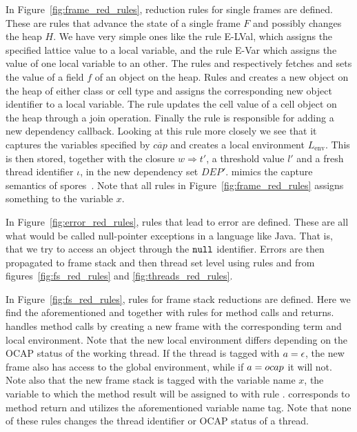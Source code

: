 In Figure~\ref{fig:frame_red_rules}, reduction rules for single frames are
defined. These are rules that advance the state of a single frame $F$ and
possibly changes the heap $H$. We have very simple ones like the rule {\sc
E-LVal}, which assigns the specified lattice value to a local variable, and the
rule {\sc E-Var} which assigns the value of one local variable to an other.
The rules \ESelect{} and \EAssign{} respectively fetches and sets the value of a
field $f$ of an object on the heap. Rules \ENew{} and \ENewCell{} creates a new
object on the heap of either class or cell type and assigns the corresponding
new object identifier to a local variable. The rule \EPut{} updates the cell
value of a cell object on the heap through a join operation.  Finally the rule
\EWhen{} is responsible for adding a new dependency callback. Looking at
this rule more closely we see that it captures the variables specified by
$\overline{cap}$ and creates a local environment $L_{\text{env}}$. This is then
stored, together with the closure $w \Rightarrow t'$, a threshold value $l'$ and
a fresh thread identifier $\iota$, in the new dependency set $DEP'$. \EWhen{} 
mimics the capture semantics of spores~\parencite{conf/ecoop/MillerHO14}.
Note that all rules in Figure~\ref{fig:frame_red_rules} assigns something to the
variable $x$.

In Figure~\ref{fig:error_red_rules}, rules that lead to error are defined. These
are all what would be called null-pointer exceptions in a language like Java.
That is, that we try to access an object through the $\mbox{\mdseries\texttt{null}}$ identifier.
Errors are then propagated to frame stack and then thread set level using rules
\EErrorFS{} and \EErrorP{} from figures~\ref{fig:fs_red_rules} and
\ref{fig:threads_red_rules}.

In Figure~\ref{fig:fs_red_rules}, rules for frame stack reductions are defined.
Here we find the aforementioned \EFProp{} and \EErrorFS{} together with rules
for method calls and returns. \ECall{} handles method calls by creating a new
frame with the corresponding term and local environment. Note that the new local
environment differs depending on the OCAP status of the working thread. If the
thread is tagged with $a = \mbox{$\epsilon$}$, the new frame also has access to the global
environment, while if $a = \mbox{$ocap$}$ it will not. Note also that the new frame
stack is tagged with the variable name $x$, the variable to which the method
result will be assigned to with rule \ERet{}. \ERet{} corresponds to method
return and utilizes the aforementioned variable name tag. Note that none of
these rules changes the thread identifier or OCAP status of a thread.

